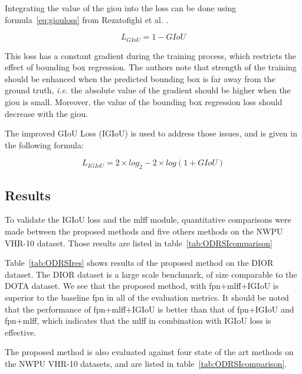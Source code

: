 Integrating the value of the \gls{giou} into the loss can be done using formula~\ref{eq:giouloss} from Rezatofighi et al. \cite{giou}.

\begin{equation}
	\label{eq:giouloss}
		L_{GIoU} = 1 - GIoU
\end{equation}

This loss has a constant gradient during the training process, which restricts the effect of bounding box regression. The authors note that strength of the training should be enhanced when the predicted bounding box is far away from the ground truth, \textit{i.e.} the absolute value of the gradient should be higher when the \gls{giou} is small. Moreover, the value of the bounding box regression loss should decrease with the \gls{giou}. 

The improved GIoU Loss (IGIoU) is used to address those issues, and is given in the following formula:

\begin{equation}
	L_{IGIoU} = 2 \times log_2 - 2 \times log(1 + GIoU)
\end{equation}

\subsection{Results}
To validate the IGIoU loss and the \gls{mlff} module, quantitative comparisons were made between the proposed methods and five others methods on the NWPU VHR-10 dataset\cite{nwpu}. Those results are listed in table~\ref{tab:ODRSIcomparison}

Table~\ref{tab:ODRSIres} shows results of the proposed method on the DIOR\cite{dior} dataset. The DIOR dataset is a large scale benchmark, of size comparable to the DOTA dataset\cite{dota}. We see that the proposed method, with \gls{fpn}+\gls{mlff}+IGIoU is superior to the baseline \gls{fpn} in all of the evaluation metrics. It should be noted that the performance of \gls{fpn}+\gls{mlff}+IGIoU is better than that of \gls{fpn}+IGIoU and \gls{fpn}+\gls{mlff}, which indicates that the \gls{mlff} in combination with IGIoU loss is effective.

The proposed method is also evaluated against four state of the art methods on the NWPU VHR-10 datasets, and are listed in table~\ref{tab:ODRSIcomparison}. 

